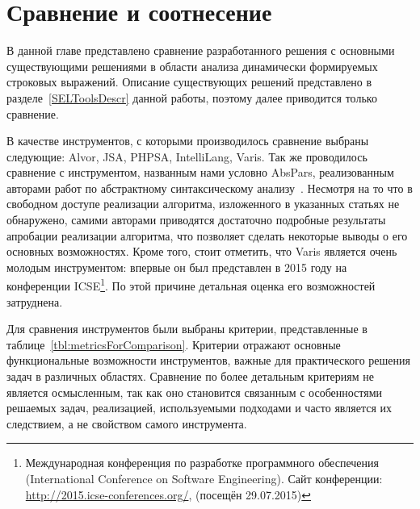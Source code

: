 \chapter{Сравнение и соотнесение} \label{chaptComp}

В данной главе представлено сравнение разработанного решения с основными существующими решениями в области анализа динамически формируемых строковых выражений. Описание существующих решений представлено в разделе~\ref{SELToolsDescr} данной работы, поэтому далее приводится только сравнение.

В качестве инструментов, с которыми производилось сравнение выбраны следующие: Alvor, JSA, PHPSA, IntelliLang, Varis. Так же проводилось сравнение с инструментом, названным нами условно AbsPars, реализованным авторами работ по абстрактному синтаксическому анализу~\cite{LrAbstract1, LrAbstract2, LRAbstractParsingSema}. Несмотря на то что в свободном доступе реализации алгоритма, изложенного в указанных статьях не обнаружено, самими авторами приводятся достаточно подробные результаты апробации реализации алгоритма, что позволяет сделать некоторые выводы о его основных возможностях. Кроме того, стоит отметить, что Varis является очень молодым инструментом: впервые он был представлен в 2015 году на конференции ICSE\footnote{Международная конференция по разработке программного обеспечения (International Conference on Software Engineering). Сайт конференции: \url{http://2015.icse-conferences.org/}, (посещён 29.07.2015)}. По этой причине детальная оценка его возможностей затруднена. 

Для сравнения инструментов были выбраны критерии, представленные в таблице~\ref{tbl:metricsForComparison}. Критерии отражают основные функциональные возможности инструментов, важные для практического решения задач в различных областях. Сравнение по более детальным критериям не является осмысленным, так как оно становится связанным с особенностями решаемых задач, реализацией, используемыми подходами и часто является их следствием, а не свойством самого инструмента.


